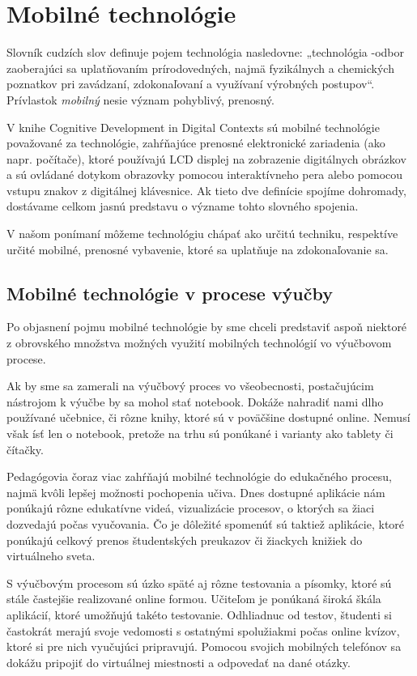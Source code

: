 \documentclass[10pt,twoside,slovak,a4paper]{article}
\begin{document}
\section{Mobilné technológie} \label{nejaka}

Slovník cudzích slov definuje pojem technológia nasledovne: „technológia -odbor zaoberajúci sa uplatňovaním prírodovedných, najmä fyzikálnych a chemických poznatkov pri zavádzaní, zdokonaľovaní a využívaní výrobných postupov“\cite{Slovnik}. Prívlastok \emph{mobilný} nesie význam pohyblivý, prenosný. 

V knihe Cognitive Development in Digital Contexts sú mobilné technológie považované za technológie, zahŕňajúce prenosné elektronické zariadenia (ako napr. počítače), ktoré používajú LCD displej na zobrazenie digitálnych obrázkov a sú ovládané dotykom obrazovky pomocou interaktívneho pera alebo pomocou vstupu znakov z digitálnej klávesnice\cite{FIETZER2017167}. Ak tieto dve definície spojíme dohromady, dostávame celkom jasnú predstavu o význame tohto slovného spojenia. 

V našom ponímaní môžeme technológiu chápať ako určitú techniku, respektíve určité mobilné, prenosné vybavenie, ktoré sa uplatňuje na zdokonaľovanie sa. 

\subsection{Mobilné technológie v procese výučby} \label{ina:vyuzitie}


Po objasnení pojmu mobilné technológie by sme chceli predstaviť aspoň niektoré z obrovského množstva možných využití mobilných technológií vo výučbovom procese. 

Ak by sme sa zamerali na výučbový proces vo všeobecnosti, postačujúcim nástrojom k výučbe by sa mohol stať notebook. Dokáže nahradiť nami dlho používané učebnice, či rôzne knihy, ktoré sú v poväčšine dostupné online. Nemusí však ísť len o notebook, pretože na trhu sú ponúkané i varianty ako tablety či čítačky.

Pedagógovia čoraz viac zahŕňajú mobilné technológie do edukačného procesu, najmä kvôli lepšej možnosti pochopenia učiva. Dnes dostupné aplikácie nám ponúkajú rôzne edukatívne videá, vizualizácie procesov, o ktorých sa žiaci dozvedajú počas vyučovania. Čo je dôležité spomenúť sú taktiež aplikácie, ktoré ponúkajú celkový prenos študentských preukazov či žiackych knižiek do virtuálneho sveta.

S výučbovým procesom sú úzko späté aj rôzne testovania a písomky, ktoré sú stále častejšie realizované online formou. Učiteľom je ponúkaná široká škála aplikácií, ktoré umožňujú takéto testovanie. Odhliadnuc od testov, študenti si častokrát merajú svoje vedomosti s ostatnými spolužiakmi počas online kvízov, ktoré si pre nich vyučujúci pripravujú. Pomocou svojich mobilných telefónov sa dokážu pripojiť do virtuálnej miestnosti a odpovedať na dané otázky.  
\end{document}

